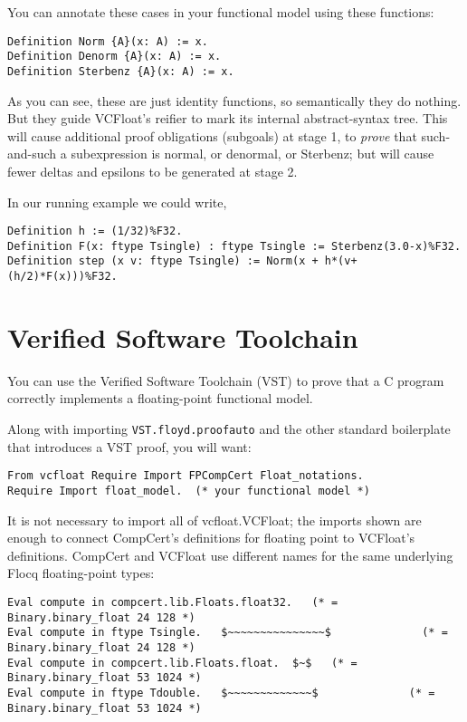 \documentclass[article]{memoir}
\begin{document}
You can annotate these cases in your functional model using these functions:

\begin{lstlisting}
Definition Norm {A}(x: A) := x.
Definition Denorm {A}(x: A) := x.
Definition Sterbenz {A}(x: A) := x.
\end{lstlisting}

As you can see, these are just identity functions, so semantically they
do nothing.  But they guide VCFloat's reifier to mark its internal
abstract-syntax tree.  This will cause additional proof obligations
(subgoals) at stage 1, to \emph{prove} that such-and-such a subexpression
is normal, or denormal, or Sterbenz; but will cause fewer
deltas and epsilons to be generated at stage 2.

In our running example we could write,
\begin{lstlisting}
Definition h := (1/32)%F32.
Definition F(x: ftype Tsingle) : ftype Tsingle := Sterbenz(3.0-x)%F32.  
Definition step (x v: ftype Tsingle) := Norm(x + h*(v+(h/2)*F(x)))%F32.
\end{lstlisting}

\chapter{Verified Software Toolchain}

You can use the Verified Software Toolchain (VST) to prove that a C program
correctly implements a floating-point functional model.

Along with importing \lstinline{VST.floyd.proofauto} and
the other standard boilerplate that introduces a VST proof,
you will want:

\begin{lstlisting}
From vcfloat Require Import FPCompCert Float_notations.
Require Import float_model.  (* your functional model *)
\end{lstlisting}

It is not necessary to import all of vcfloat.VCFloat; the imports shown
are enough to connect CompCert's definitions for floating point
to VCFloat's definitions.  CompCert and VCFloat use different names
for the same underlying Flocq floating-point types:

\begin{lstlisting}
Eval compute in compcert.lib.Floats.float32.   (* = Binary.binary_float 24 128 *)
Eval compute in ftype Tsingle.   $~~~~~~~~~~~~~~~$              (* = Binary.binary_float 24 128 *)
Eval compute in compcert.lib.Floats.float.  $~$   (* = Binary.binary_float 53 1024 *)
Eval compute in ftype Tdouble.   $~~~~~~~~~~~~~$              (* = Binary.binary_float 53 1024 *)
\end{lstlisting}
\end{document}
